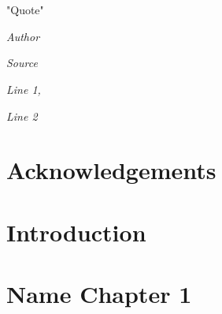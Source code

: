 \documentclass[a4paper,11pt]{book}
\numberwithin{equation}{chapter}
\theoremstyle{plain}
\theoremstyle{definition}
\begin{document}


\thispagestyle{empty}



\thispagestyle{empty}


\chapter*{}
\thispagestyle{empty}
\begin{flushright}
    "Quote"
    
    \vspace{4mm}
    \emph{Author}
    
    \emph{Source}
\end{flushright}


\vspace{30mm}

\begin{flushright}
    \emph{Line 1,} 
    
    \emph{Line 2}
    
    \emph{}
\end{flushright}






\chapter*{Acknowledgements}





\tableofcontents



\chapter*{Introduction}









\chapter{Name Chapter 1}

\label{chap:chap1}
\end{document}

